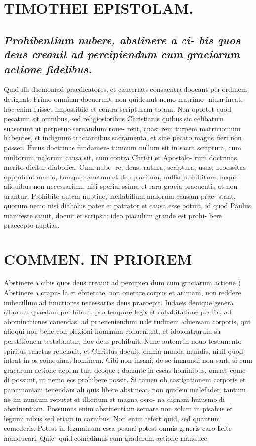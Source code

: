 \documentclass{article}
\begin{document}
\begin{pages}
\section*{TIMOTHEI EPISTOLAM. }
\marginpar{[ p.97 ]}
{}
\subsection*{\textit{Prohibentium nubere, abstinere a ci- bis quos deus creauit ad percipiendum cum graciarum actione fidelibus. }}\pstart Quid illi daemoniad praedicatores, et cauteriats consaentia dooeant per ordinem designat. Primo omnium docuerunt, non quidemut nemo matrimo- nium ineat, hoc enim fuisset impossibile et contra scripturam totam. Non oportet quod pecatum sit omnibus, sed religiosioribus Christianis quibus sic celibatum suaserunt ut perpetuo seruandum uoue- rent, quasi rem turpem matrimonium habentes, et indignum tractantibus sacramenta, et sine pecato magno fieri non posset. Huius doctrinae fundamen- tumcum nullum sit in sacra scriptura, cum multorum malorum causa sit, cum contra Christi et Apostolo- rum doctrinas, merito dicitur diabolica. Cum nube- re, deus, natura, scriptura, usus, neoessitas approbent omnia, tumque sanctum et deo placitum, nullis prohibitum, neque aliquibus non necessarium, nisi special ssima et rara gracia praeuentis ut non urantur. Prohibite autem nuptiae, ineffabilium malorum causam prae- stant, quorum nemo nisi diabolus pater et patrator et causa esse potuit, id quod Paulus manifeste saiuit, docuit et scripsit: ideo piaculum grande est prohi- bere praecepto nuptias.  \pend
\section*{COMMEN. IN PRIOREM }
\marginpar{[ p.98 ]}\pstart Abstinere a cibis quos deus creauit ad percipien dum cum graciarum actione ) Abstinere a crapu- la et ebrietate, non onerare corpus et animam, non reddere imbecillum ad functiones necessarias deus praeoepit. Iudaeis denique genera ciborum quaedam pro hibuit, pro tempore legis et cohabitatione pacific, ad abominationes cauendas, ad praeueniendum uale tudinem aduersam corporis, qui alioqui non bene con plexioni hominum conueniunt, et idololatrarum su perstitionem testabantur, hoc deus prohibuit. Nunc autem in nouo testamento spiritus sanctus reuelauit, et Christus docuit, omnia munda mundis, nihil quod intrat in os coinquinat hominem. Cibi non insani, de se immundi non sant, si cum gracarum actione acpiun tur, deoque ; donante in escas hominibus, omnes come di possunt, ut nemo eos prohibere possit. Si tamen ob castigationem corporis et parcimoniam tenendam ali quis libere abstineat, non quidem malefadet, tantum ne iin nundum reputet et illicitum et magna oero- na dignam huiusmo di abstinentiam. Possumus enim abstinentiam seruare non solum in pisabus et legumi nibus sed etiam in carnibus. Non enim refert quid, sed quantum comederis. Potest in leguminum esca peaari potest omnis generis caro licite manducari. Quic- quid comedimus cum gradarum actione manduce-  \pend

\end{pages}
\end{document}
